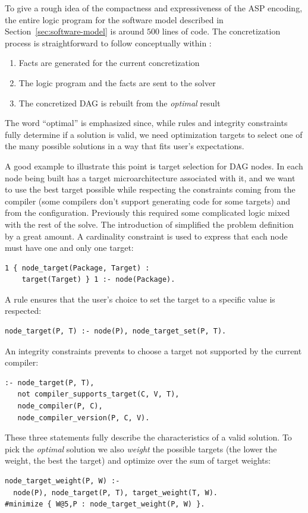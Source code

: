 To give a rough idea of the compactness and expressiveness of 
the ASP encoding, the entire logic program for the software 
model described in Section~\ref{sec:software-model} is around 
$500$ lines of code. The concretization process is straightforward
to follow conceptually within \spack:
\begin{enumerate}
\item Facts are generated for the current concretization \footnotemark
\item The logic program and the facts are sent to the solver
\item The concretized DAG is rebuilt from the \emph{optimal} result
\end{enumerate}
The word ``optimal'' is emphasized since, while rules and integrity 
constraints fully determine if a solution is valid, we need 
optimization targets to select one of the many possible solutions
in a way that fits user's expectations.

A good example to illustrate this point is target selection for DAG nodes.
In \spack{} each node being built has a target microarchitecture associated with it, and we want to use the best target possible while respecting the constraints coming from the compiler (some compilers don't support generating code for some targets) and from the configuration. 
Previously this required some complicated logic mixed with the rest of the solve.
The introduction of \clingo{} simplified the problem definition by a great amount. A cardinality constraint is used to express that each node must have one and only one target:
\begin{verbatim}
1 { node_target(Package, Target) : 
    target(Target) } 1 :- node(Package).
\end{verbatim}
A rule ensures that the user's choice to set the target to a specific value is respected:
\begin{verbatim}
node_target(P, T) :- node(P), node_target_set(P, T).
\end{verbatim}
An integrity constraints prevents to choose a target not supported by the current compiler:
\begin{verbatim}
:- node_target(P, T),
   not compiler_supports_target(C, V, T),
   node_compiler(P, C),
   node_compiler_version(P, C, V).
\end{verbatim}
These three statements fully describe the characteristics of a valid solution. To pick the \emph{optimal} solution we also \emph{weight} the possible targets
(the lower the weight, the best the target) and optimize over the sum of target weights:
\begin{verbatim}
node_target_weight(P, W) :- 
  node(P), node_target(P, T), target_weight(T, W).
#minimize { W@5,P : node_target_weight(P, W) }.
\end{verbatim}

